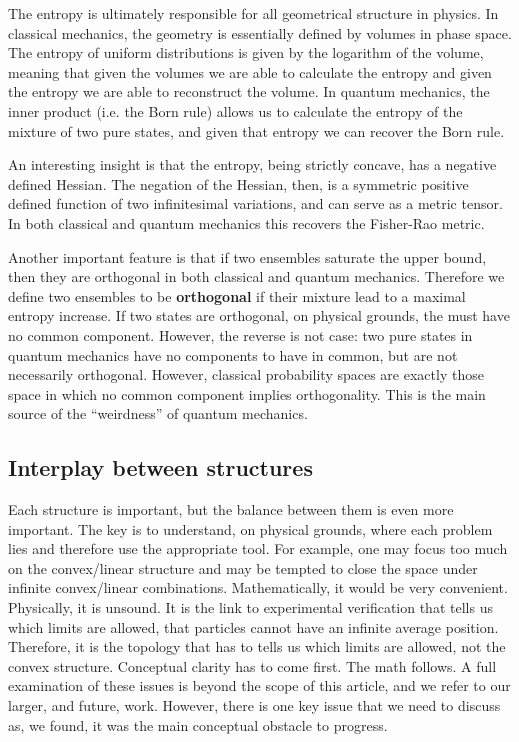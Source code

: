 \documentclass[10pt,twocolumn, nofootinbib]{revtex4-2}
\begin{document}
The entropy is ultimately responsible for all geometrical structure in physics. In classical mechanics, the geometry is essentially defined by volumes in phase space. The entropy of uniform distributions is given by the logarithm of the volume, meaning that given the volumes we are able to calculate the entropy and given the entropy we are able to reconstruct the volume. In quantum mechanics, the inner product (i.e. the Born rule) allows us to calculate the entropy of the mixture of two pure states, and given that entropy we can recover the Born rule.

An interesting insight is that the entropy, being strictly concave, has a negative defined Hessian. The negation of the Hessian, then, is a symmetric positive defined function of two infinitesimal variations, and can serve as a metric tensor. In both classical and quantum mechanics this recovers the Fisher-Rao metric.

Another important feature is that if two ensembles saturate the upper bound, then they are orthogonal in both classical and quantum mechanics. Therefore we define two ensembles to be \textbf{orthogonal} if their mixture lead to a maximal entropy increase. If two states are orthogonal, on physical grounds, the must have no common component. However, the reverse is not case: two pure states in quantum mechanics have no components to have in common, but are not necessarily orthogonal. However, classical probability spaces are exactly those space in which no common component implies orthogonality. This is the main source of the ``weirdness'' of quantum mechanics.

\subsection{Interplay between structures}

Each structure is important, but the balance between them is even more important. The key is to understand, on physical grounds, where each problem lies and therefore use the appropriate tool. For example, one may focus too much on the convex/linear structure and may be tempted to close the space under infinite convex/linear combinations. Mathematically, it would be very convenient. Physically, it is unsound. It is the link to experimental verification that tells us which limits are allowed, that particles cannot have an infinite average position. Therefore, it is the topology that has to tells us which limits are allowed, not the convex structure. Conceptual clarity has to come first. The math follows. A full examination of these issues is beyond the scope of this article, and we refer to our larger, and future, work. However, there is one key issue that we need to discuss as, we found, it was the main conceptual obstacle to progress.
\end{document}
